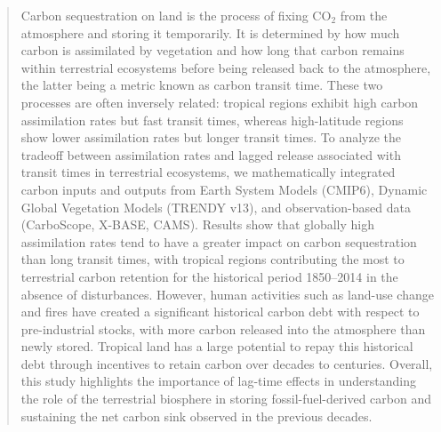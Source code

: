 \documentclass[9pt,twocolumn,twoside]{pnas-new}
\begin{document}
\begin{abstract} %
Carbon sequestration on land is the process of fixing CO$_2$ from the atmosphere and storing it temporarily. It is determined by how much carbon is assimilated by vegetation and how long that carbon remains within terrestrial ecosystems before being released back to the atmosphere, the latter being a metric known as carbon transit time. These two processes are often inversely related: tropical regions exhibit high carbon assimilation rates but fast transit times, whereas high-latitude regions show lower assimilation rates but longer transit times. To analyze the tradeoff between assimilation rates and lagged release associated with transit times in terrestrial ecosystems, we mathematically integrated carbon inputs and outputs from Earth System Models (CMIP6), Dynamic Global Vegetation Models (TRENDY v13), and observation-based data (CarboScope, X-BASE, CAMS). Results show that globally high assimilation rates tend to have a greater impact on carbon sequestration than long transit times, with tropical regions contributing the most to terrestrial carbon retention for the historical period 1850--2014 in the absence of disturbances. However, human activities such as land-use change and fires have created a significant historical carbon debt with respect to pre-industrial stocks, with more carbon released into the atmosphere than newly stored. Tropical land has a large potential to repay this historical debt through incentives to retain carbon over decades to centuries. Overall, this study highlights the importance of lag-time effects in understanding the role of the terrestrial biosphere in storing fossil-fuel-derived carbon and sustaining the net carbon sink observed in the previous decades. 



\end{abstract}
\end{document}
